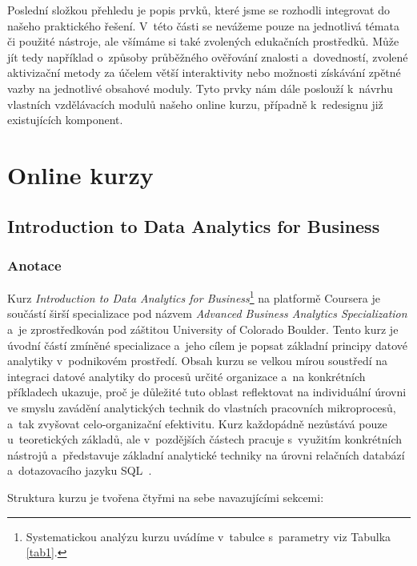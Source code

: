 Poslední složkou přehledu je popis prvků, které jsme se rozhodli integrovat do našeho praktického řešení. V~této části se nevážeme pouze na jednotlivá témata či použité nástroje, ale všímáme si také zvolených edukačních prostředků. Může jít tedy například o~způsoby průběžného ověřování znalosti a~dovedností, zvolené aktivizační metody za účelem větší interaktivity nebo možnosti získávání zpětné vazby na jednotlivé obsahové moduly. Tyto prvky nám dále poslouží k~návrhu vlastních vzdělávacích modulů našeho online kurzu, případně k~redesignu již existujících komponent.

\hypertarget{online-kurzy}{%
\section{Online kurzy}\label{online-kurzy}}

\hypertarget{introduction-to-data-analytics-for-business}{%
\subsection{Introduction to Data Analytics for Business}\label{introduction-to-data-analytics-for-business}}

\hypertarget{anotace}{%
\subsubsection{Anotace}\label{anotace}}

Kurz \emph{Introduction to Data Analytics for Business}\footnote{Systematickou analýzu kurzu uvádíme v~tabulce s~parametry viz Tabulka \ref{tab1}.} na platformě Coursera je součástí širší specializace pod názvem \emph{Advanced Business Analytics Specialization} a~je zprostředkován pod záštitou University of Colorado Boulder. Tento kurz je úvodní částí zmíněné specializace a~jeho cílem je popsat základní principy datové analytiky v~podnikovém prostředí. Obsah kurzu se velkou mírou soustředí na integraci datové analytiky do procesů určité organizace a~na konkrétních příkladech ukazuje, proč je důležité tuto oblast reflektovat na individuální úrovni ve smyslu zavádění analytických technik do vlastních pracovních mikroprocesů, a~tak zvyšovat celo-organizační efektivitu. Kurz každopádně nezůstává pouze u~teoretických základů, ale v~pozdějších částech pracuje s~využitím konkrétních nástrojů a~představuje základní analytické techniky na úrovni relačních databází a~dotazovacího jazyku SQL~\parencite{course1}.

Struktura kurzu je tvořena čtyřmi na sebe navazujícími sekcemi:


